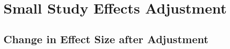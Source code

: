 \documentclass[11pt,a4paper,twoside]{book}\usepackage[]{graphicx}\usepackage[]{color}
\begin{document}

\section{Small Study Effects Adjustment}


\subsection{Change in Effect Size after Adjustment} \label{sec:change.size}
\end{document}
